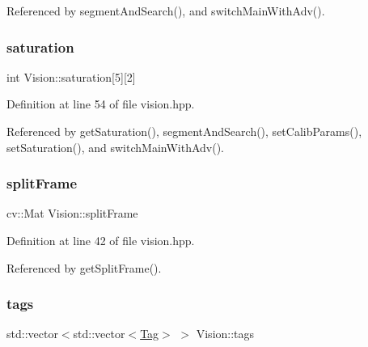 Referenced by segment\+And\+Search(), and switch\+Main\+With\+Adv().

\mbox{\label{class_vision_a71a7f9859283e916a0dfb1467eaf5b13}} 
\subsubsection{\texorpdfstring{saturation}{saturation}}
{\footnotesize\ttfamily int Vision\+::saturation\mbox{[}5\mbox{]}\mbox{[}2\mbox{]}\hspace{0.3cm}{\ttfamily [private]}}



Definition at line 54 of file vision.\+hpp.



Referenced by get\+Saturation(), segment\+And\+Search(), set\+Calib\+Params(), set\+Saturation(), and switch\+Main\+With\+Adv().

\mbox{\label{class_vision_a5099dad8e3d8cb0ec58083a47a4171a8}} 
\subsubsection{\texorpdfstring{split\+Frame}{splitFrame}}
{\footnotesize\ttfamily cv\+::\+Mat Vision\+::split\+Frame\hspace{0.3cm}{\ttfamily [private]}}



Definition at line 42 of file vision.\+hpp.



Referenced by get\+Split\+Frame().

\mbox{\label{class_vision_acc5bbdf18ba36cc516c17999308be267}} 
\subsubsection{\texorpdfstring{tags}{tags}}
{\footnotesize\ttfamily std\+::vector$<$std\+::vector$<$\hyperlink{class_tag}{Tag}$>$ $>$ Vision\+::tags\hspace{0.3cm}{\ttfamily [private]}}



